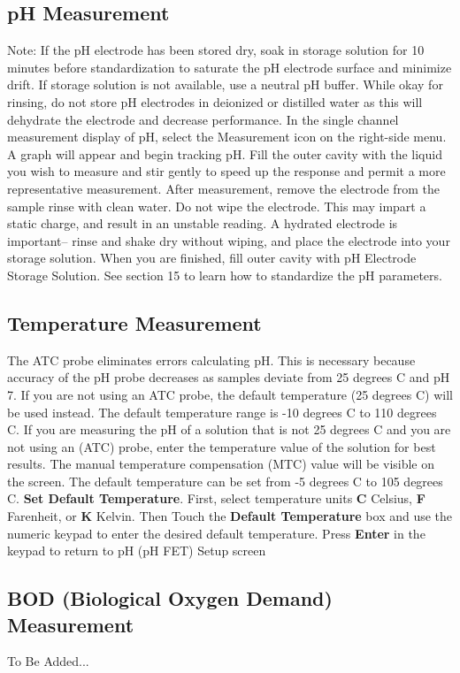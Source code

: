 \documentclass[12pt]{../SOP3}\usepackage[]{graphicx}\usepackage[]{xcolor}
\begin{document}
\subsection{pH Measurement}
\NP Note: If the pH electrode has been stored dry, soak in storage solution for 10 minutes before standardization to saturate the pH electrode surface and minimize drift. If storage solution is not available, use a neutral pH buffer. While okay for rinsing, do not store pH electrodes in deionized or distilled water as this will dehydrate the electrode and decrease performance.
\NP In the single channel measurement display of pH, select the Measurement icon on the right-side menu. A graph will appear and begin tracking pH.
\NP Fill the outer cavity with the liquid you wish to measure and stir gently to speed up the response and permit a more representative measurement.
\NP After measurement, remove the electrode from the sample rinse with clean water. Do not wipe the electrode. This may impart a static charge, and result in an unstable reading. A hydrated electrode is important– rinse and shake dry without wiping, and place the electrode into your storage solution.
\NP When you are finished, fill outer cavity with pH Electrode Storage Solution.
\NP See section 15 to learn how to standardize the pH parameters.

\subsection{Temperature Measurement}
\NP The ATC probe eliminates errors calculating pH. This is necessary because accuracy of the pH probe decreases as samples deviate from 25 degrees C and pH 7. If you are not using an ATC probe, the default temperature (25 degrees C) will be used instead. The default temperature range is -10 degrees C to 110 degrees C. 
\NP If  you  are measuring the  pH  of  a  solution  that  is  not  25 degrees C  and  you  are  not  using  an (ATC)  probe, enter  the  temperature  value  of  the  solution  for  best  results.
The manual temperature compensation (MTC) value will be visible on the screen. The default temperature can be set from -5 degrees C to 105 degrees C.
\NP\textbf{Set Default Temperature}. First, select temperature units \textbf{C} Celsius, \textbf{F} Farenheit, or \textbf{K} Kelvin. Then Touch the \textbf{Default Temperature} box and use the numeric keypad to enter the desired default temperature.
Press \textbf{Enter} in the keypad to return to pH (pH FET) Setup screen


\subsection{BOD (Biological Oxygen Demand) Measurement}
\NP To Be Added...
\end{document}
